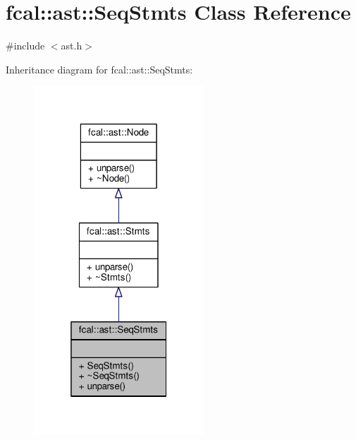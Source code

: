 \hypertarget{classfcal_1_1ast_1_1SeqStmts}{}\section{fcal\+:\+:ast\+:\+:Seq\+Stmts Class Reference}
\label{classfcal_1_1ast_1_1SeqStmts}


{\ttfamily \#include $<$ast.\+h$>$}



Inheritance diagram for fcal\+:\+:ast\+:\+:Seq\+Stmts\+:
\nopagebreak
\begin{figure}[H]
\begin{center}
\leavevmode
\includegraphics[width=181pt]{classfcal_1_1ast_1_1SeqStmts__inherit__graph}
\end{center}
\end{figure}


